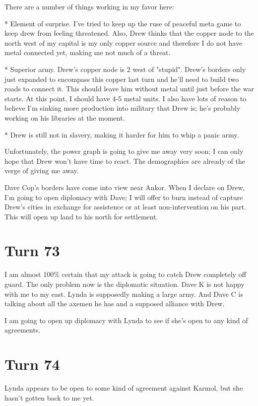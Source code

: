 \documentclass[10pt]{article}
\begin{document}
There are a number of things working in my favor here:

* Element of surprise. I've tried to keep up the ruse of peaceful meta
game to keep drew from feeling threatened. Also, Drew thinks that the
copper node to the north west of my capital is my only copper source
and therefore I do not have metal connected yet, making me not much of
a threat.

* Superior army. Drew's copper node is 2 west of "stupid". Drew's
borders only just expanded to encompass this copper last turn and
he'll need to build two roads to connect it. This should leave him
without metal until just before the war starts. At this point, I
should have 4-5 metal units. I also have lots of reason to believe I'm
sinking more production into military that Drew is; he's probably
working on his libraries at the moment.

* Drew is still not in slavery, making it harder for him to whip a
panic army.

Unfortunately, the power graph is going to give me away very soon; I
can only hope that Drew won't have time to react. The demographics are
already of the verge of giving me away.

Dave Cop's borders have come into view near Ankor. When I declare on
Drew, I'm going to open diplomacy with Dave; I will offer to burn
instead of capture Drew's cities in exchange for assistence or at
least non-intervention on his part. This will open up land to his
north for settlement.

\section*{Turn 73}

I am almost 100\% certain that my attack is going to catch Drew
completely off guard. The only problem now is the diplomatic
situation. Dave K is not happy with me to my east. Lynda is supposedly
making a large army. And Dave C is talking about all the axemen he has
and a supposed alliance with Drew.

I am going to open up diplomacy with Lynda to see if she's open to any kind of agreements.

\section*{Turn 74}

Lynda appears to be open to some kind of agreement against Karmol, but
she hasn't gotten back to me yet.
\end{document}
